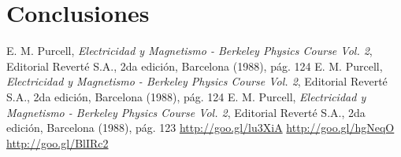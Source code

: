 \documentclass[twoside,twocolumn,a4paper]{article}
\begin{document}


\section{Conclusiones}



\begin{thebibliography}{99} %

 E. M. Purcell, \textit{Electricidad y Magnetismo - Berkeley Physics Course Vol. 2}, Editorial Revert\'e S.A., 2da edici\'on, Barcelona (1988), p\'ag. 124
 E. M. Purcell, \textit{Electricidad y Magnetismo - Berkeley Physics Course Vol. 2}, Editorial Revert\'e S.A., 2da edici\'on, Barcelona (1988), p\'ag. 124
 E. M. Purcell, \textit{Electricidad y Magnetismo - Berkeley Physics Course Vol. 2}, Editorial Revert\'e S.A., 2da edici\'on, Barcelona (1988), p\'ag. 123
 \url{http://goo.gl/lu3XiA}
 \url{http://goo.gl/hgNeqO}
 \url{http://goo.gl/BlIRc2}
 
\end{thebibliography}

\end{document}
